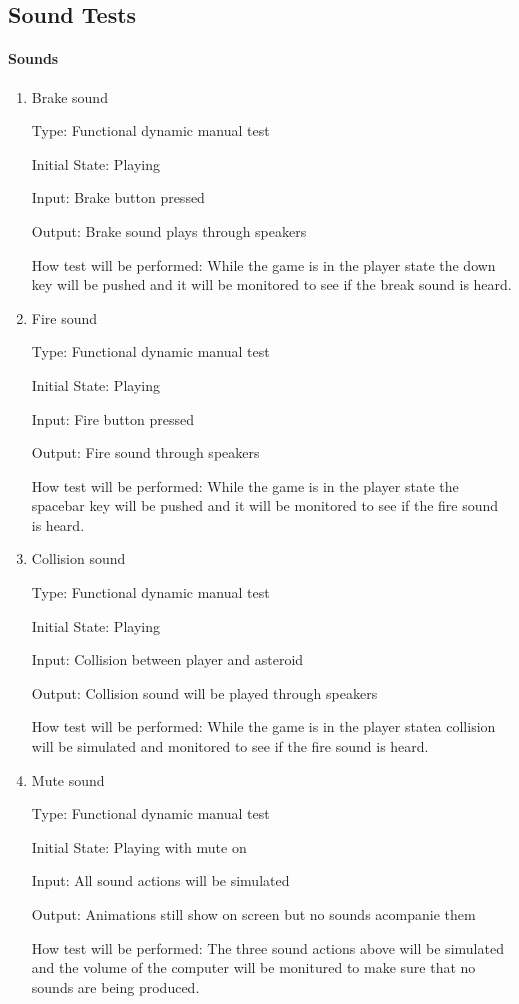 \documentclass[12pt, titlepage]{article}
\begin{document}
\subsection{Sound Tests}

\paragraph{Sounds}

\begin{enumerate}
\item{Brake sound\\}

Type: Functional dynamic manual test

Initial State: Playing

Input: Brake button pressed

Output: Brake sound plays through speakers

How test will be performed: While the game is in the player state the down key will be pushed and it will be monitored to see if the break sound is heard.

\item{Fire sound\\}

Type: Functional dynamic manual test

Initial State: Playing

Input: Fire button pressed

Output: Fire sound through speakers

How test will be performed: While the game is in the player state the spacebar key will be pushed and it will be monitored to see if the fire sound is heard.

\item{Collision sound\\}

Type: Functional dynamic manual test

Initial State: Playing

Input: Collision between player and asteroid

Output: Collision sound will be played through speakers

How test will be performed: While the game is in the player statea collision will be simulated and monitored to see if the fire sound is heard.

\item{Mute sound\\}

Type: Functional dynamic manual test

Initial State: Playing with mute on

Input: All sound actions will be simulated

Output: Animations still show on screen but no sounds acompanie them

How test will be performed: The three sound actions above will be simulated and the volume of the computer will be monitured to make sure that no sounds are being produced.

\end{enumerate}
\end{document}
